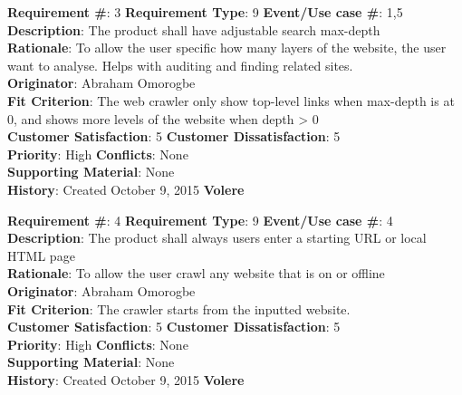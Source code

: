 \documentclass[titlepage]{article}
\begin{document}
\begin{framed}
\textbf{Requirement \#}: 3 \hfill \textbf{Requirement Type}: 9 \hfill\textbf{Event/Use case \#}: 1,5 \hfill\\
\textbf{Description}:  The product shall have adjustable search max-depth\\
\textbf{Rationale}: To allow the user specific how many layers of the website, the user want to analyse. Helps with auditing and finding related sites.\\
\textbf{Originator}: Abraham Omorogbe\\
\textbf{Fit Criterion}: The web crawler only show top-level links when max-depth is at 0, and shows more levels of the website when depth > 0\\
\textbf{Customer Satisfaction}: 5 \hfill 	\textbf{Customer Dissatisfaction}: 5 \hfill\\
\textbf{Priority}: High \hfill \textbf{Conflicts}: None \hfill 		\\
\textbf{Supporting Material}: None\\
\textbf{History}: Created October 9, 2015 \hfill	 \textbf{Volere}\hfill

\end{framed}

\begin{framed}
\textbf{Requirement \#}: 4 \hfill \textbf{Requirement Type}: 9 \hfill\textbf{Event/Use case \#}: 4 \hfill\\
\textbf{Description}:  The product shall always users enter a starting URL or local HTML page\\
\textbf{Rationale}: To allow the user crawl any website that is on or offline\\
\textbf{Originator}: Abraham Omorogbe\\
\textbf{Fit Criterion}: The crawler starts from the inputted website.\\
\textbf{Customer Satisfaction}: 5 \hfill 	\textbf{Customer Dissatisfaction}: 5 \hfill\\
\textbf{Priority}: High \hfill \textbf{Conflicts}: None \hfill 		\\
\textbf{Supporting Material}: None\\
\textbf{History}: Created October 9, 2015 \hfill	 \textbf{Volere}\hfill

\end{framed}
\end{document}
